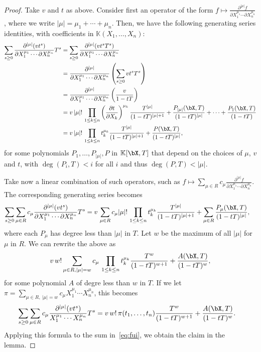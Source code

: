 \documentclass[12pt]{article}
\def\K {\ensuremath{\mathbb{K}}}
\begin{document}
\begin{proof}
  Take $v$ and $t$ as above. Consider first
  an operator of the form $f \mapsto \frac{ \partial^{|\mu|}  f}
  {\partial X_1^{\mu_1} \cdots \partial X_n^{\mu_n}}$, where 
we write $|\mu|=\mu_1+\cdots+\mu_n$. Then, we have
  the following generating series identities, with coefficients in 
  $\K(X_1,\dots,X_n)$:
\begin{align*}
\sum_{s \ge 0} 
\frac{ \partial^{|\mu|} ( v t^s )} {\partial X_1^{\mu_1} \cdots
  \partial X_n^{\mu_n}}
 T^s 
&=  \sum_{s \ge 0} 
\frac{ \partial^{|\mu|} (v t^s T^s)} {\partial X_1^{\mu_1} \cdots
  \partial X_n^{\mu_n}}\\
&=  
\frac{ \partial^{|\mu|} } {\partial X_1^{\mu_1} \cdots
  \partial X_n^{\mu_n}}
 \left (\sum_{s \ge 0} v t^s T^s\right ) \\
&= \frac{ \partial^{|\mu|} } {\partial X_1^{\mu_1} \cdots
  \partial X_n^{\mu_n}}
 \left (\frac v{1-tT} \right ) \\
&= v\, |\mu|!\, \prod_{1 \le k \le n} 
\left (\frac{ \partial t} {\partial X_k} \right)^{\mu_k}
\frac {T^{|\mu|}}{(1-t T)^{|\mu|+1}} + \frac{P_{|\mu|}(\bX,T)}{(1-t T)^{|\mu|}} + \cdots + \frac{P_{1}(\bX,T)}{(1-t T)}\\
&= v\, |\mu|!\, \prod_{1 \le k \le n} 
t_k^{\mu_k}
\frac {T^{|\mu|}}{(1-t T)^{|\mu|+1}} + \frac{P(\bX,T)}{(1-t T)^{|\mu|}},
\end{align*}
for some polynomials $P_1,\dots,P_{|\mu|},P$ in $\K[\bX,T]$ that
depend on the choices of $\mu$, $v$ and $t$, with $\deg(P_i,T) < i$
for all $i$ and thus $\deg(P,T) < |\mu|$.

Take now a linear combination of such operators, such as 
$f \mapsto \sum_{\mu \in R} c_\mu \frac{ \partial^{|\mu|}  f } {\partial X_1^{\mu_1} \cdots
  \partial X_n^{\mu_n}}$. The corresponding generating series
becomes
\begin{align*}
\sum_{s \ge 0} 
\sum_{\mu \in R} c_\mu \frac{ \partial^{|\mu|} ( v t^s )} {\partial X_1^{\mu_1} \cdots
  \partial X_n^{\mu_n}}
 T^s 
&=
v\,\sum_{\mu \in R} c_\mu
 |\mu|!\, \prod_{1 \le k \le n} 
t_k^{\mu_k}
\frac {T^{|\mu|}}{(1-t T)^{|\mu|+1}} +\sum_{\mu \in R} \frac{P_\mu(\bX,T)}{(1-t T)^{|\mu|}},
\end{align*}
where each $P_\mu$ has degree less than $|\mu|$ in $T$.
Let $w$ be the maximum of all $|\mu|$ for $\mu$ in $R$. We can rewrite 
the above as
\begin{align*}
v\, w! 
\sum_{\mu \in R, |\mu|=w} c_\mu
\, \prod_{1 \le k \le n} 
t_k^{\mu_k}
\frac {T^{w}}{(1-t T)^{w+1}}
 + \frac{A(\bX,T)}{(1-t T)^{w}},
\end{align*}
for some polynomial $A$ of degre less than $w$ in $T$. If we let 
$\pi =\sum_{\mu \in R,\ |\mu|=w} c_{\mu} X_1^{\mu_1} \cdots
  X_n^{\mu_n}$, this becomes
\begin{align*}
\sum_{s \ge 0} 
\sum_{\mu \in R} c_\mu \frac{ \partial^{|\mu|} ( v t^s )} { X_1^{\mu_1} \cdots
 X_n^{\mu_n}}
 T^s 
&=
v\, w! \,  \pi(t_1,\dots,t_n)
\frac {T^{w}}{(1-t T)^{w+1}}
 + \frac{A(\bX,T)}{(1-t T)^{w}}.
\end{align*}
Applying this formula to the sum in~\eqref{eq:fui}, we obtain the
claim in the lemma.
\end{proof}
\end{document}
